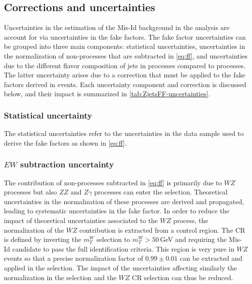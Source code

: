     \subsection{Corrections and uncertainties}
    Uncertainties in the estimation of the Mis-Id background in the analysis are account for via uncertainties in the fake factors.
    The fake factor uncertainties can be grouped into three main components: statistical uncertainties, uncertainties in the normalization of non-\Zjets processes that are subtracted in \cref{eq:ff}, and uncertainties due to the different flavor composition of jets in \Zjets processes compared to \Wjets processes.
    The latter uncertainty arises due to a correction that must be applied to the fake factors derived in \Zjets events.
    Each uncertainty component and correction is discussed below, and their impact is summarized in \cref{tab:ZjetsFF-uncertainties}.


    \subsubsection{Statistical uncertainty}
    The statistical uncertainties refer to the uncertainties in the data sample used to derive the fake factors as shown in \cref{eq:ff}.

    \subsubsection{$EW$ subtraction uncertainty}
    The contribution of non-\Zjets processes subtracted in \cref{eq:ff} is primarily due to $WZ$ processes but also $ZZ$ and $Z\gamma$ processes can enter the \Zjets selection.
    Theoretical uncertainties in the normalization of these processes are derived and propagated, leading to systematic uncertainties in the fake factor.
    In order to reduce the impact of theoretical uncertainties associated to the $WZ$ process, the normalization of the $WZ$ contribution is extracted from a control region. The CR is defined by inverting the $m_T^W$ selection to $m_T^W > 50\,$GeV and requiring the Mis-Id candidate to pass the full identification criteria. This region is very pure in $WZ$ events so that a precise normalization factor of $0.99 \pm 0.01$ can be extracted and applied in the \Zjets selection. The impact of the uncertainties affecting similarly the normalization in the \Zjets selection and the $WZ$ CR selection can thus be reduced.


